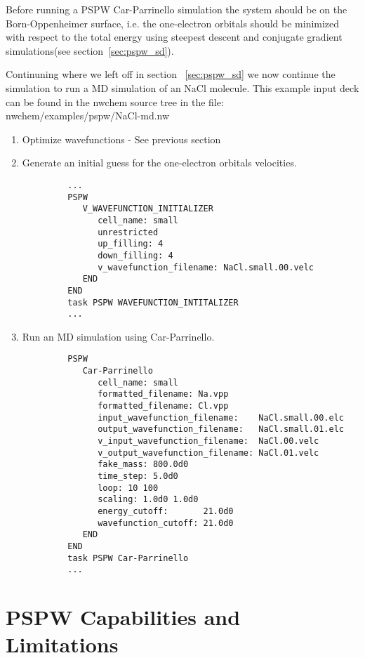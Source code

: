 Before running a PSPW Car-Parrinello  simulation the system should be
on the Born-Oppenheimer surface, i.e. the one-electron
orbitals should be minimized with respect to the total energy using steepest
descent and conjugate gradient simulations(see section~\ref{sec:pspw_sd}).  

Continuning where we left off in section ~\ref{sec:pspw_sd} we now 
continue the simulation to run a MD simulation of an NaCl molecule.  
This example input deck can be found in the nwchem source tree in 
the file: nwchem/examples/pspw/NaCl-md.nw

\begin{enumerate}
\item Optimize wavefunctions - See previous section

\normalsize
\item Generate an initial guess for the one-electron orbitals velocities.
\tiny   \begin{verbatim}
         ...
         PSPW
            V_WAVEFUNCTION_INITIALIZER
               cell_name: small
               unrestricted
               up_filling: 4
               down_filling: 4
               v_wavefunction_filename: NaCl.small.00.velc
            END
         END
         task PSPW WAVEFUNCTION_INTITALIZER
         ...
   \end{verbatim}
\normalsize
\item Run an MD simulation using Car-Parrinello.
\tiny \begin{verbatim}
         PSPW
            Car-Parrinello
               cell_name: small
               formatted_filename: Na.vpp
               formatted_filename: Cl.vpp
               input_wavefunction_filename:    NaCl.small.00.elc
               output_wavefunction_filename:   NaCl.small.01.elc
               v_input_wavefunction_filename:  NaCl.00.velc
               v_output_wavefunction_filename: NaCl.01.velc
               fake_mass: 800.0d0
               time_step: 5.0d0
               loop: 10 100
               scaling: 1.0d0 1.0d0
               energy_cutoff:       21.0d0
               wavefunction_cutoff: 21.0d0
            END 
         END
         task PSPW Car-Parrinello
         ...
      \end{verbatim}


\end{enumerate}
\normalsize



\section{PSPW Capabilities and Limitations}
\label{sec:pspw_limits}

